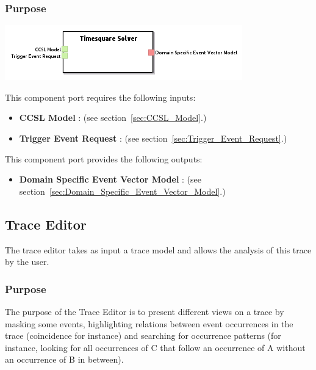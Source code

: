 \documentclass{gemoc} %
\begin{document}

\subsubsection{Purpose}


\begin{center}
\includegraphics*[trim=0.0cm 0.0cm 0cm 0.0cm, clip=true]{../images/generated/Generated_Timesquare_Solver.png}
\end{center}

This component port requires the following inputs:
\begin{itemize}
  \item \textbf{CCSL Model} :
(see section~\ref{sec:CCSL_Model}.)
  \item \textbf{Trigger Event Request} :
(see section~\ref{sec:Trigger_Event_Request}.)
\end{itemize}

This component port provides the following outputs:
\begin{itemize}
  \item \textbf{Domain Specific Event Vector Model} :
(see section~\ref{sec:Domain_Specific_Event_Vector_Model}.)
\end{itemize}


\subsection{Trace Editor}
\label{sec:Trace_Editor}
The trace editor takes as input a trace model and allows the analysis of this trace by the user.

\subsubsection{Purpose}
The purpose of the Trace Editor is to present different views on a trace by masking some events, highlighting relations between event occurrences in the trace (coincidence for instance) and searching for occurrence patterns (for instance, looking for all occurrences of C that follow an occurrence of A without an occurrence of B in between).
 
\end{document}
